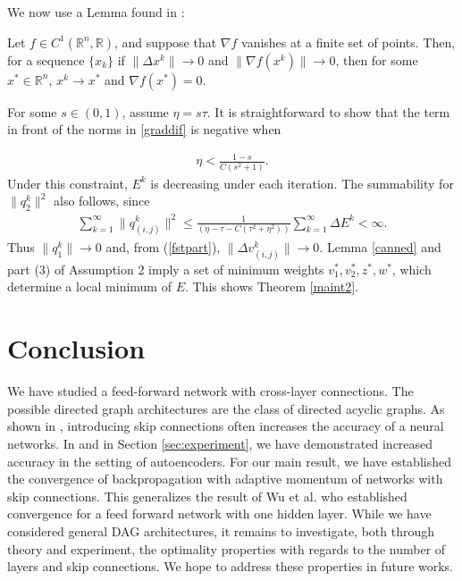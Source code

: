 \documentclass{jcmlatex}
\begin{document}
We now use a Lemma found in  \cite{sun2006}:

\begin{lemma}\label{canned}
Let $f \in C^1( \mathbb R^n, \mathbb R)$, and suppose that  $\nabla f$ vanishes
at a finite set of points.  Then, for a sequence $\{x_k\}$ if $\|\Delta x^k\|
\rightarrow 0$ and $\|\nabla f(x^k)\|\rightarrow 0$, then for some $x^* \in
\mathbb R^n$,  $x^k \rightarrow x^*$ and $\nabla f(x^*) = 0$.
\end{lemma}

For some $s \in (0,1)$, assume $\eta = s\tau $.  It is straightforward to show that the term in
front of the norms in \ref{graddif} is negative when

\begin{align}
\eta < \frac{1-s}{C(s^2+1)}.
\end{align}
Under this constraint, $E^k$ is decreasing under each iteration. The summability
for $\|q_{2}^k\|^2$ also follows, since
\begin{align}
\sum_{k = 1}^\infty \|q_{(i,j)}^k\|^2 \le\frac 1{\left(\eta-\tau- C(\tau^2+\eta^2)\right)}
\sum_{k = 1}^\infty \Delta E^k <\infty.   
\end{align}
Thus  $\|q_{1}^k\|\rightarrow 0$ and, from (\ref{fstpart}),  $ \|\Delta v_{(i,j)}^k\|\rightarrow 0.$
Lemma \ref{canned}
and part (3) of Assumption 2 imply a set of minimum weights $v^*_{1}, v_2^*, z^*, w^*$,
which determine a local minimum of $E$. This shows Theorem \ref{maint2}.

\section{Conclusion}
We have studied a feed-forward network with cross-layer connections. The possible directed graph architectures are the class of directed acyclic graphs.  As shown in \cite{huang2016densely}, introducing skip connections often increases the accuracy of a neural networks. In \cite{agarwal2018crossencoder} and in Section \ref{sec:experiment}, we have demonstrated increased accuracy in the setting of autoencoders. For our main result, we have established the convergence of backpropagation with adaptive momentum of networks with skip connections. This generalizes the result of Wu et al. \cite{wu2008convergence} who established convergence for a feed forward network with one hidden layer. While we have considered general DAG architectures, it remains to investigate, both through theory and experiment, the optimality properties with regards to the number of layers and  skip connections. We hope to address these properties in future works. 



\end{document}
